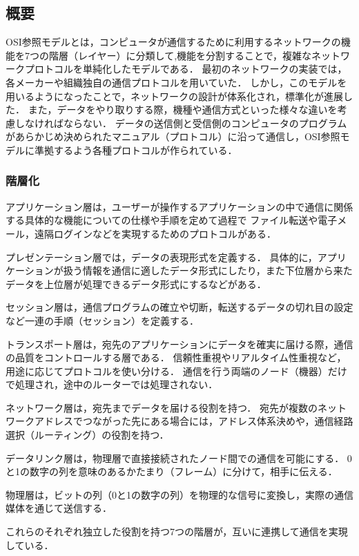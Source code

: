 \documentclass[12pt,a4j,titlepage]{ltjsarticle}
\begin{document}
\subsection{概要}
OSI参照モデルとは，コンピュータが通信するために利用するネットワークの機能を7つの階層（レイヤー）に分類して,機能を分割することで，複雑なネットワークプロトコルを単純化したモデルである．
最初のネットワークの実装では，各メーカーや組織独自の通信プロトコルを用いていた．
しかし，このモデルを用いるようになったことで，ネットワークの設計が体系化され，標準化が進展した．
また，データをやり取りする際，機種や通信方式といった様々な違いを考慮しなければならない．
データの送信側と受信側のコンピュータのプログラムがあらかじめ決められたマニュアル（プロトコル）に沿って通信し，OSI参照モデルに準拠するよう各種プロトコルが作られている．

\subsubsection{階層化}
アプリケーション層は，ユーザーが操作するアプリケーションの中で通信に関係する具体的な機能についての仕様や手順を定めて過程で
ファイル転送や電子メール，遠隔ログインなどを実現するためのプロトコルがある．

プレゼンテーション層では，データの表現形式を定義する．
具体的に，アプリケーションが扱う情報を通信に適したデータ形式にしたり，また下位層から来たデータを上位層が処理できるデータ形式にするなどがある．

セッション層は，通信プログラムの確立や切断，転送するデータの切れ目の設定など一連の手順（セッション）を定義する．

トランスポート層は，宛先のアプリケーションにデータを確実に届ける際，通信の品質をコントロールする層である．
信頼性重視やリアルタイム性重視など，用途に応じてプロトコルを使い分ける．
通信を行う両端のノード（機器）だけで処理され，途中のルーターでは処理されない．

ネットワーク層は，宛先までデータを届ける役割を持つ．
宛先が複数のネットワークアドレスでつながった先にある場合には，アドレス体系決めや，通信経路選択（ルーティング）の役割を持つ．

データリンク層は，物理層で直接接続されたノード間での通信を可能にする．
0と1の数字の列を意味のあるかたまり（フレーム）に分けて，相手に伝える．

物理層は，ビットの列（0と1の数字の列）を物理的な信号に変換し，実際の通信媒体を通じて送信する．

これらのそれぞれ独立した役割を持つ7つの階層が，互いに連携して通信を実現している．
\end{document}
